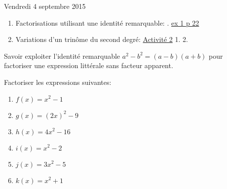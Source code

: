 \documentclass[a4paper,11pt]{article}
\theoremstyle{break}
\begin{document}
  Vendredi 4 septembre 2015
  \begin{enumerate}
   \item Factorisations utilisant une identité remarquable: .
   \href{https://github.com/mathlorgues/math1sd1516/blob/master/20150904/1-2-3p22.png}
   {ex 1 p 22}
   \item Variations d'un trinôme du second degré:
   \href{https://github.com/mathlorgues/math1sd1516/blob/master/20150904/activite.pdf}
   {Activité 2}
    1. 2.
   
  \end{enumerate}
  
   \begin{Dev}
     
     Savoir exploiter l'identité remarquable $a^2-b^2=(a-b)(a+b)$ pour factoriser 
     une expression littérale sans facteur apparent.
     
     \begin{exo}
       
    Factoriser les expressions suivantes:
    \begin{enumerate}
     \item $f(x)=x^2-1$
     \item $g(x)=(2x)^2-9$
     \item $h(x)=4x^2-16$
     \item $i(x)=x^2-2$
     \item $j(x)=3x^2-5$
     \item $k(x)=x^2+1$
    \end{enumerate}
    
     
    \end{exo}

  
  \end{Dev}
  
  \newpage
  
\end{document}
